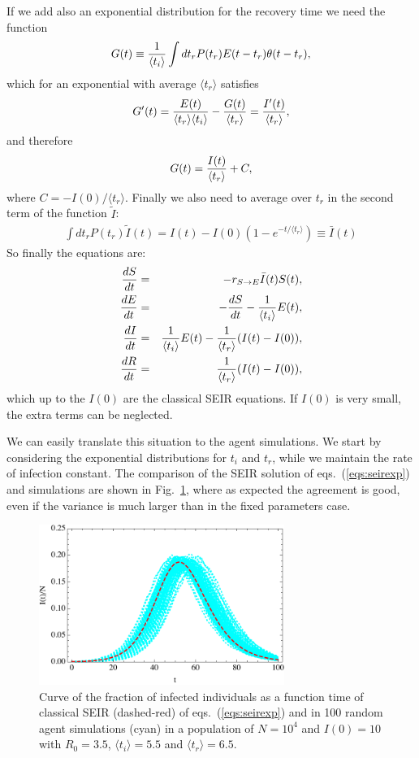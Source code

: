 \documentclass[a4paper,oneside,11pt]{article}
\begin{document}
If we add also an exponential distribution for the recovery time we need the function
\begin{eqnarray}
G(t) \equiv {1\over \langle t_i\rangle } \int dt_r P(t_r) E(t-t_r) \theta(t-t_r), 
\end{eqnarray}
which for an exponential with average $\langle t_r\rangle$ satisfies
\begin{eqnarray}
G'(t) = {E(t)\over \langle t_r\rangle \langle t_i\rangle} - {G(t)\over  \langle t_r\rangle} = {I'(t)\over \langle t_r \rangle},
\end{eqnarray}
and therefore 
\begin{eqnarray}
G(t) = {I(t)\over \langle t_r \rangle} + C,
\end{eqnarray}
where $C= -I(0)/\langle t_r \rangle$.
Finally we also need to average over $t_r$ in the second term of the function $\tilde{I}$:
\begin{eqnarray}
\int d t_r P(t_r) \tilde{I}(t) = I(t) - I(0) \left(1- e^{-t/\langle t_r\rangle}  \right) \equiv \bar{I}(t)
\end{eqnarray}
 So finally the equations are:
\begin{eqnarray}
{d S\over dt} &=& - r_{S\rightarrow E} \bar{I}(t) S(t),\nonumber\\ 
{d E\over dt} &=& -{d S\over d t} -{1 \over \langle t_i\rangle} E(t) ,\nonumber\\
{d I\over dt} &=& {1 \over \langle t_i\rangle} E(t) - {1\over  \langle t_r \rangle} (I(t) -I(0)),\nonumber\\
{d R\over d t} &=&  {1\over  \langle t_r\rangle} (I(t)-I(0)),\nonumber\\
\label{eqs:seirexp}
\end{eqnarray}
which up to the $I(0)$ are the classical SEIR equations. If $I(0)$ is very small, the extra terms 
 can  be neglected. 

We can easily translate this situation to the agent simulations.  
We start by considering the exponential distributions for $t_i$ and $t_r$, while we maintain the rate of infection constant. The comparison of the SEIR solution of eqs.~(\ref{eqs:seirexp}) and simulations are shown in Fig.~\ref{fig:exp}, where as expected the agreement is good, even if the variance is much larger than in the fixed parameters case.
\begin{figure}[h!]
  \centering
  \includegraphics[width=8cm]{expseir.pdf}
  \caption{ Curve of the fraction of infected individuals as a function time of  classical SEIR (dashed-red) of eqs.~(\ref{eqs:seirexp}) and in 100 random agent simulations (cyan) in a  population of $N=10^4$ and $I(0)=10$ with $R_0=3.5$, $\langle t_i\rangle=5.5$ and $\langle t_r\rangle=6.5$.  }
  \label{fig:exp}
   \end{figure}  
   
\end{document}
